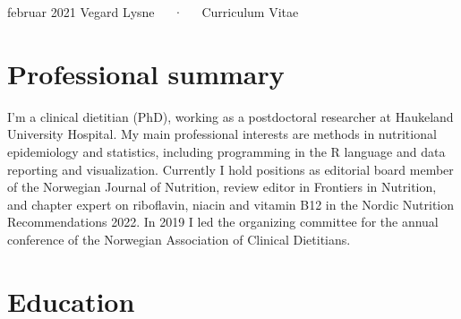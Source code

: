 \documentclass[11pt, a4paper]{awesome-cv}
\begin{document}
\makecvheader

\makecvfooter
  {februar 2021}
    {Vegard Lysne~~~·~~~Curriculum Vitae}
  {\thepage}





\hypertarget{professional-summary}{%
\section{Professional summary}\label{professional-summary}}

I'm a clinical dietitian (PhD), working as a postdoctoral researcher at
Haukeland University Hospital. My main professional interests are
methods in nutritional epidemiology and statistics, including
programming in the R language and data reporting and visualization.
Currently I hold positions as editorial board member of the Norwegian
Journal of Nutrition, review editor in Frontiers in Nutrition, and
chapter expert on riboflavin, niacin and vitamin B12 in the Nordic
Nutrition Recommendations 2022. In 2019 I led the organizing committee
for the annual conference of the Norwegian Association of Clinical
Dietitians.

\hypertarget{education}{%
\section{Education}\label{education}}

\begin{cventries}
\end{cventries}
\end{document}

